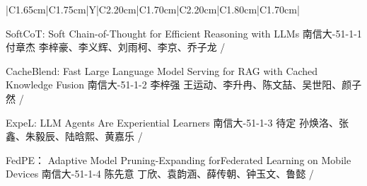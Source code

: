 \Needspace{7.5cm}
\begin{tabularx}{\textwidth}{|C{1.65cm}|C{1.75cm}|Y|C{2.20cm}|C{1.70cm}|C{2.20cm}|C{1.80cm}|C{1.70cm}|}
\HeaderRow

{SoftCoT: Soft Chain-of-Thought for Efficient Reasoning with LLMs\newline }
{南信大-51-1-1}
{付章杰}
{李梓豪、李义辉、刘雨柯、李京、乔子龙}
{}{/}

{CacheBlend: Fast Large Language Model Serving for RAG with Cached Knowledge Fusion\newline }
{南信大-51-1-2}
{李梓强}
{王运动、李升冉、陈文喆、吴世阳、颜子然}
{}{/}


{ExpeL: LLM Agents Are Experiential Learners \newline }
{南信大-51-1-3}
{待定}
{孙焕洛、张鑫、朱毅辰、陆晗熙、黄嘉乐}
{}{/}

{ FedPE： Adaptive Model Pruning-Expanding forFederated Learning on Mobile Devices\newline }
{南信大-51-1-4}
{陈先意}
{丁欣、袁韵涵、薛传朝、钟玉文、鲁懿}
{}{/}
\end{tabularx}
\BlockGap



